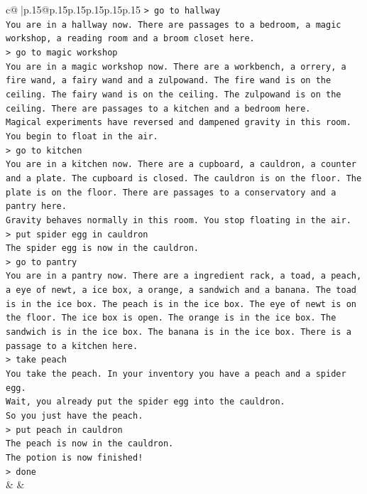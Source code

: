 \documentclass{article}
\begin{document}
{\begin{supertabular}{c@{$\;$}|p{.15\linewidth}@{}p{.15\linewidth}p{.15\linewidth}p{.15\linewidth}p{.15\linewidth}p{.15\linewidth}}
{{{\texttt{> go to hallway} \\
\texttt{You are in a hallway now. There are passages to a bedroom, a magic workshop, a reading room and a broom closet here.} \\
\texttt{> go to magic workshop} \\
\texttt{You are in a magic workshop now. There are a workbench, a orrery, a fire wand, a fairy wand and a zulpowand. The fire wand is on the ceiling. The fairy wand is on the ceiling. The zulpowand is on the ceiling. There are passages to a kitchen and a bedroom here.} \\
\texttt{Magical experiments have reversed and dampened gravity in this room. You begin to float in the air.} \\
\texttt{> go to kitchen} \\
\texttt{You are in a kitchen now. There are a cupboard, a cauldron, a counter and a plate. The cupboard is closed. The cauldron is on the floor. The plate is on the floor. There are passages to a conservatory and a pantry here.} \\
\texttt{Gravity behaves normally in this room. You stop floating in the air.} \\
\texttt{> put spider egg in cauldron} \\
\texttt{The spider egg is now in the cauldron.} \\
\texttt{> go to pantry} \\
\texttt{You are in a pantry now. There are a ingredient rack, a toad, a peach, a eye of newt, a ice box, a orange, a sandwich and a banana. The toad is in the ice box. The peach is in the ice box. The eye of newt is on the floor. The ice box is open. The orange is in the ice box. The sandwich is in the ice box. The banana is in the ice box. There is a passage to a kitchen here.} \\
\texttt{> take peach} \\
\texttt{You take the peach. In your inventory you have a peach and a spider egg.} \\
\texttt{Wait, you already put the spider egg into the cauldron.} \\
\texttt{So you just have the peach.} \\
\texttt{> put peach in cauldron} \\
\texttt{The peach is now in the cauldron.} \\
\texttt{The potion is now finished!} \\
\texttt{> done} \\
            }
        }
    }
    & & \\ \\


\end{supertabular}}
\end{document}
